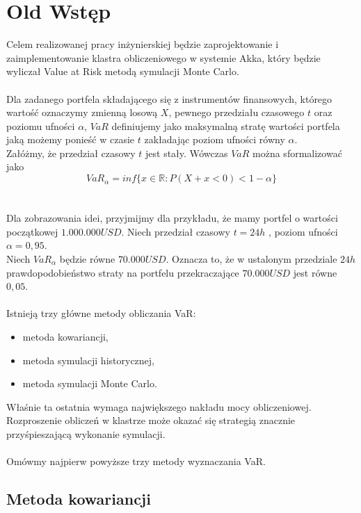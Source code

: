 \documentclass[11pt,titlepage]{article}
\numberwithin{equation}{section}
\begin{document}
\section{Old Wstęp}      %



Celem realizowanej pracy inżynierskiej będzie zaprojektowanie i zaimplementowanie klastra obliczeniowego w systemie Akka, który będzie wyliczał Value at Risk metodą symulacji Monte Carlo. 
\\
\\
Dla zadanego portfela składającego się z instrumentów finansowych, którego wartość oznaczymy zmienną losową $X$, pewnego przedziału czasowego $t$ oraz poziomu ufności $\alpha$, $VaR$ definiujemy jako maksymalną stratę wartości portfela jaką możemy ponieść w czasie $t$ zakładając poziom ufności równy $\alpha$.
\\
Załóżmy, że przedział czasowy $t$ jest stały. Wówczas $VaR$ można sformalizować jako
$$VaR_{\alpha}=inf\{ x\in \mathbb{R}:P(X+x<0) <  1-\alpha \}$$
\\
\\
Dla zobrazowania idei, przyjmijmy dla przykładu, że mamy portfel o wartości początkowej $1.000.000 USD$. Niech przedział czasowy $t=24h$ , poziom ufności $\alpha=0,95$. 
\\
Niech $VaR_{\alpha}$ będzie równe $70.000 USD$. Oznacza to, że w ustalonym przedziale $24h$ prawdopodobieństwo straty na portfelu przekraczające $70.000 USD$ jest równe $0,05$.  
\\
\\
\noindent Istnieją trzy główne metody obliczania VaR:

\begin{itemize}
  \item metoda kowariancji,
	\item metoda symulacji historycznej,
	\item metoda symulacji Monte Carlo.

\end{itemize}
Właśnie ta ostatnia wymaga największego nakładu mocy obliczeniowej. Rozproszenie obliczeń w klastrze może okazać się strategią znacznie przyśpieszającą wykonanie symulacji. 
\\
\\
Omówmy najpierw powyższe trzy metody wyznaczania VaR. 


\subsection{Metoda kowariancji}
\end{document}

